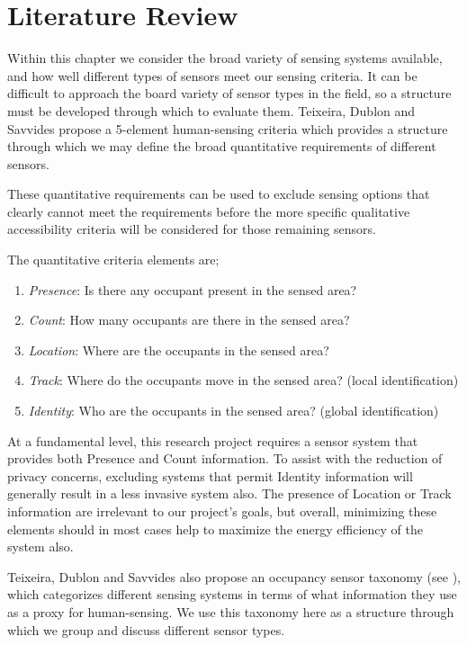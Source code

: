 \documentclass[../thesis/thesis.tex]{subfiles}
\begin{document}
\chapter{Literature Review}
\label{chap:litreview}

Within this chapter we consider the broad variety of sensing systems available, and how well different types of sensors meet our sensing criteria. It can be difficult to approach the board variety of sensor types in the field, so a structure must be developed through which to evaluate them. Teixeira, Dublon and Savvides \cite{teixeira2010survey} propose a 5-element human-sensing criteria which provides a structure through which we may define the broad quantitative requirements of different sensors.

These quantitative requirements can be used to exclude sensing options that clearly cannot meet the requirements before the more specific qualitative accessibility criteria will be considered for those remaining sensors. 

The quantitative criteria elements are;
\begin{enumerate}
 \item \emph{Presence}: Is there any occupant present in the sensed area?
 \item \emph{Count}: How many occupants are there in the sensed area?
 \item \emph{Location}: Where are the occupants in the sensed area?
 \item \emph{Track}: Where do the occupants move in the sensed area? (local identification)
 \item \emph{Identity}: Who are the occupants in the sensed area? (global identification)
\end{enumerate}

At a fundamental level, this research project requires a sensor system that provides both Presence and Count information. To assist with the reduction of privacy concerns, excluding systems that permit Identity information will generally result in a less invasive system also. The presence of Location or Track information are irrelevant to our project's goals, but overall, minimizing these elements should in most cases help to maximize the energy efficiency of the system also.

Teixeira, Dublon and Savvides \cite{teixeira2010survey} also propose an occupancy sensor taxonomy (see ), which categorizes different sensing systems in terms of what information they use as a proxy for human-sensing. We use this taxonomy here as a structure through which we group and discuss different sensor types.
\end{document}
